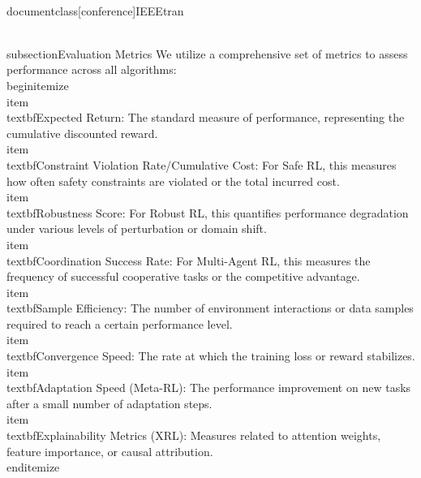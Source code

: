 \\documentclass[conference]{IEEEtran}
\begin{document}
\\subsection{Evaluation Metrics}
We utilize a comprehensive set of metrics to assess performance across all algorithms:
\\begin{itemize}
    \\item \\textbf{Expected Return:} The standard measure of performance, representing the cumulative discounted reward.
    \\item \\textbf{Constraint Violation Rate/Cumulative Cost:} For Safe RL, this measures how often safety constraints are violated or the total incurred cost.
    \\item \\textbf{Robustness Score:} For Robust RL, this quantifies performance degradation under various levels of perturbation or domain shift.
    \\item \\textbf{Coordination Success Rate:} For Multi-Agent RL, this measures the frequency of successful cooperative tasks or the competitive advantage.
    \\item \\textbf{Sample Efficiency:} The number of environment interactions or data samples required to reach a certain performance level.
    \\item \\textbf{Convergence Speed:} The rate at which the training loss or reward stabilizes.
    \\item \\textbf{Adaptation Speed (Meta-RL):} The performance improvement on new tasks after a small number of adaptation steps.
    \\item \\textbf{Explainability Metrics (XRL):} Measures related to attention weights, feature importance, or causal attribution.
\\end{itemize}
\end{document}
